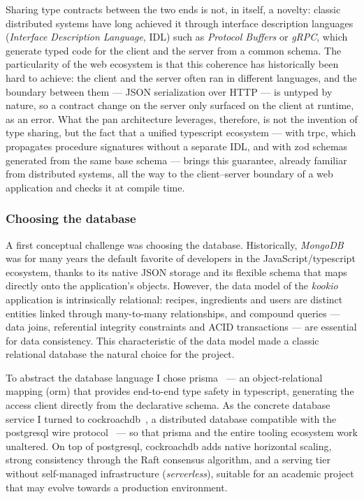 Sharing type contracts between the two ends is not, in itself, a novelty: classic distributed systems have long achieved it through interface description languages (\textit{Interface Description Language}, IDL) such as \textit{Protocol Buffers} or \textit{gRPC}, which generate typed code for the client and the server from a common schema. The particularity of the \gls{web} ecosystem is that this coherence has historically been hard to achieve: the client and the server often ran in different languages, and the boundary between them --- JSON serialization over HTTP --- is untyped by nature, so a contract change on the server only surfaced on the client at runtime, as an error. What the \gls{pan} architecture leverages, therefore, is not the invention of type sharing, but the fact that a unified \gls{typescript} ecosystem --- with \acrshort{trpc}, which propagates procedure signatures without a separate IDL, and with \gls{zod} schemas generated from the same base schema --- brings this guarantee, already familiar from distributed systems, all the way to the client--server boundary of a web application and checks it at compile time.

\subsubsection*{Choosing the database}

A first conceptual challenge was choosing the database.
Historically, \textit{MongoDB} was for many years the default favorite of developers in the JavaScript/\gls{typescript} ecosystem, thanks to its native JSON storage and its flexible schema that maps directly onto the application's objects.
However, the data model of the \textit{\gls{kookio}} application is intrinsically relational: recipes, ingredients and users are distinct entities linked through many-to-many relationships, and compound queries --- data joins, referential integrity constraints and ACID transactions --- are essential for data consistency.
This characteristic of the data model made a classic relational database the natural choice for the project.

To abstract the database language I chose \gls{prisma}~\cite{prisma_orm} --- an object-relational mapping (\acrshort{orm}) that provides end-to-end type safety in \gls{typescript}, generating the access client directly from the declarative schema.
As the concrete database service I turned to \gls{cockroachdb}~\cite{cockroachdb}, a distributed database compatible with the \gls{postgresql} wire protocol~\cite{postgresql} --- so that \gls{prisma} and the entire tooling ecosystem work unaltered.
On top of \gls{postgresql}, \gls{cockroachdb} adds native horizontal scaling, strong consistency through the Raft consensus algorithm, and a serving tier without self-managed infrastructure (\textit{serverless}), suitable for an academic project that may evolve towards a production environment.

